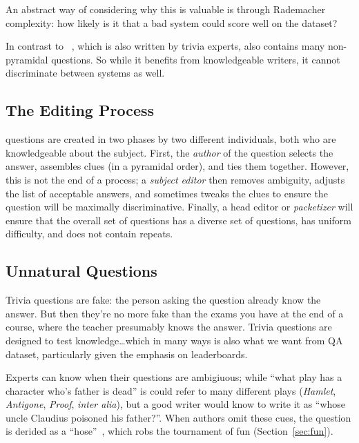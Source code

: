 An abstract way of considering why this is valuable is through Rademacher complexity: how likely is it that a bad system could score well on the dataset?

In contrast to \triviaqa{}~\cite{joshi-17}, which is also written by trivia experts, also contains many non-pyramidal questions.
So while it benefits from knowledgeable writers, it cannot discriminate between systems as well.

\subsection{The Editing Process}

\qb{} questions are created in two phases by two different individuals, both who are knowledgeable about the subject.
First, the \emph{author} of the question selects the answer, assembles clues (in a pyramidal order), and ties them together.
However, this is not the end of a process; a \emph{subject editor} then removes ambiguity, adjusts the list of acceptable answers, and sometimes tweaks the clues to ensure the question will be maximally discriminative.
Finally, a head editor or \emph{packetizer} will ensure that the overall set of questions has a diverse set of questions, has uniform difficulty, and does not contain repeats.

\subsection{Unnatural Questions}
\label{sec:unnatural}

Trivia questions are fake: the person asking the question already know the answer.  
But then they're no more fake than the exams you have at the end of a course, where the teacher presumably knows the answer. 
Trivia questions are designed to test knowledge\dots which in many ways is also what we want from QA dataset, particularly given the emphasis on leaderboards.  

Experts can know when their questions are ambigiuous; while ``what play has a character who's father is dead'' is could refer to many different plays (\textit{Hamlet}, \textit{Antigone}, \textit{Proof}, \textit{inter alia}), but a good writer would know to write it as ``whose uncle Claudius poisoned his father?''.
When authors omit these cues, the question is derided as a ``hose''~\cite{2013-eltinge}, which robs the tournament of fun (Section~\ref{sec:fun}).

